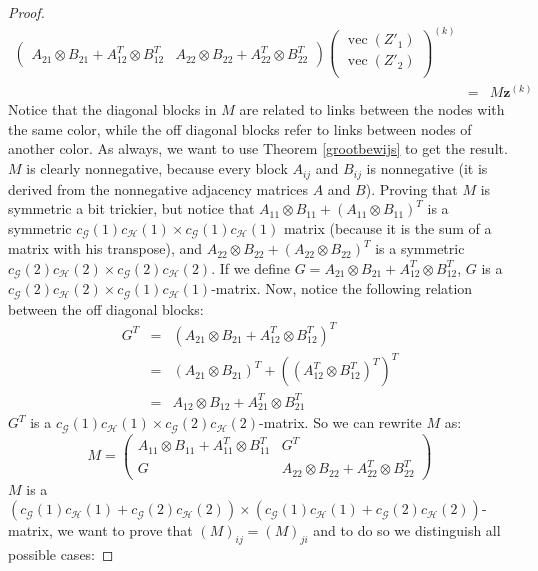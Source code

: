 \documentclass[a4paper,11pt]{report}
\newcommand{\graf}{\mathscr{G}}
\newcommand{\grafeen}{\mathscr{H}}
\newcommand{\vect}{\operatorname{vec}}
\begin{document}
\begin{proof}
\begin{eqnarray*}
\begin{pmatrix}
A_{21}\otimes B_{21} + A^T_{12}\otimes B^T_{12} & A_{22}\otimes B_{22} + A^T_{22}\otimes B^T_{22}
\end{pmatrix}
\begin{pmatrix}
\vect(Z'_1)\\
\vect(Z'_2)\\
\end{pmatrix}^{(k)}\\
&=& M\mathbf{z}^{(k)}
\end{eqnarray*}
Notice that the diagonal blocks in $M$ are related to links between the nodes with the same color, 
while the off diagonal blocks refer to links between nodes of another color. As 
always, we want to use Theorem \ref{grootbewijs} to get the result. $M$ is 
clearly nonnegative, because every block $A_{ij}$ and $B_{ij}$ is nonnegative (it is derived from the nonnegative adjacency matrices $A$ and 
$B$). Proving that $M$ is symmetric a bit trickier, but notice that $A_{11}\otimes B_{11} + (A_{11}\otimes B_{11})^T$
is a symmetric $c_\graf(1)c_\grafeen(1)\times c_\graf(1)c_\grafeen(1)$ matrix (because it is the sum of a matrix with his transpose), and $A_{22}\otimes B_{22} + (A_{22}\otimes B_{22})^T$ is a symmetric 
$c_\graf(2)c_\grafeen(2)\times c_\graf(2)c_\grafeen(2)$. If we define $G = A_{21} \otimes B_{21} + A^T_{12}\otimes B^T_{12}$, $G$ is a $c_\graf(2)c_\grafeen(2) \times c_\graf(1)c_\grafeen(1)$-matrix. Now, notice the following relation between the off diagonal blocks:
\begin{eqnarray*}
  G^T &=& (A_{21} \otimes B_{21} + A^T_{12}\otimes B^T_{12})^T \\
  &=& (A_{21} \otimes B_{21})^T + ((A^T_{12}\otimes B^T_{12})^T)^T\\
  &=& A_{12}\otimes B_{12}+A^T_{21}\otimes B^T_{21}
  \end{eqnarray*}
$G^T$ is a $c_\graf(1)c_\grafeen(1) \times c_\graf(2)c_\grafeen(2)$-matrix.
So we can rewrite $M$ as:
$$M = \begin{pmatrix}
A_{11}\otimes B_{11} + A^T_{11}\otimes B^T_{11}& G^T\\
G & A_{22}\otimes B_{22} + A^T_{22}\otimes B^T_{22}
\end{pmatrix}$$
 $M$ is a $(c_\graf(1)c_\grafeen(1)+c_\graf(2)c_\grafeen(2))\times(c_\graf(1)c_\grafeen(1)+c_\graf(2)c_\grafeen(2))$-matrix, we want to prove that $(M)_{ij}  = (M)_{ji}$ and to do so we distinguish all possible cases: 
 

\end{proof}
\end{document}
